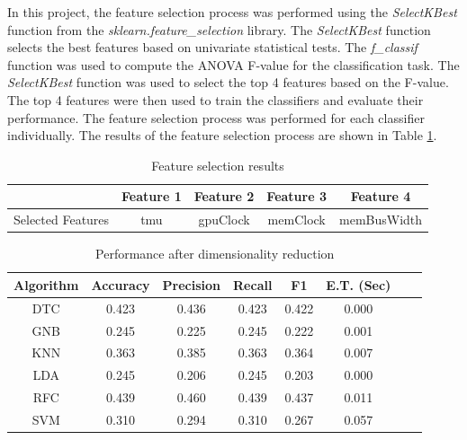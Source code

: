 \documentclass[conference,onecolumn]{IEEEtran}
\begin{document}
            In this project, the feature selection process was performed using the \emph{SelectKBest} function from the \emph{sklearn.feature\_selection} library. The \emph{SelectKBest} function selects the best features based on univariate statistical tests. The \emph{f\_classif} function was used to compute the ANOVA F-value for the classification task. The \emph{SelectKBest} function was used to select the top 4 features based on the F-value. The top 4 features were then used to train the classifiers and evaluate their performance. The feature selection process was performed for each classifier individually. The results of the feature selection process are shown in Table \ref{table:featureSelectionResults}. 
            
            \begin{table}[H]
                \centering
                \begin{tabular}{c|c|c|c|c}
                    \hline
                    &   Feature 1 &   Feature 2 &   Feature 3 &   Feature 4 \\  \hline
                    \hline
                    Selected Features 	&tmu	& gpuClock	& memClock	& memBusWidth   \\
                    \hline
                \end{tabular}
                \caption{Feature selection results}
                \label{table:featureSelectionResults}
            \end{table}

        \begin{table}[H]
            \centering
            \begin{tabular}{|c|c|c|c|c|c|c|c|}
                \hline
                    \textbf{Algorithm} &\textbf{Accuracy} &\textbf{Precision} &\textbf{Recall} &\textbf{F1} &\textbf{E.T. (Sec)} \\ \hline
                    \hline
                    DTC    & 0.423   & 0.436   & 0.423  & 0.422   & 0.000 \\ \hline
                    GNB    & 0.245   & 0.225   & 0.245  & 0.222   & 0.001 \\ \hline
                    KNN    & 0.363   & 0.385   & 0.363  & 0.364   & 0.007 \\ \hline
                    LDA    & 0.245   & 0.206   & 0.245  & 0.203   & 0.000 \\ \hline
                    RFC    & 0.439   & 0.460   & 0.439  & 0.437   & 0.011 \\ \hline
                    SVM    & 0.310   & 0.294   & 0.310  & 0.267   & 0.057 \\                    
                \hline
            \end{tabular}
            \caption{Performance after dimensionality reduction}
            \label{tab:performanceAfterDimensionalityReduction}
        \end{table}
\end{document}
